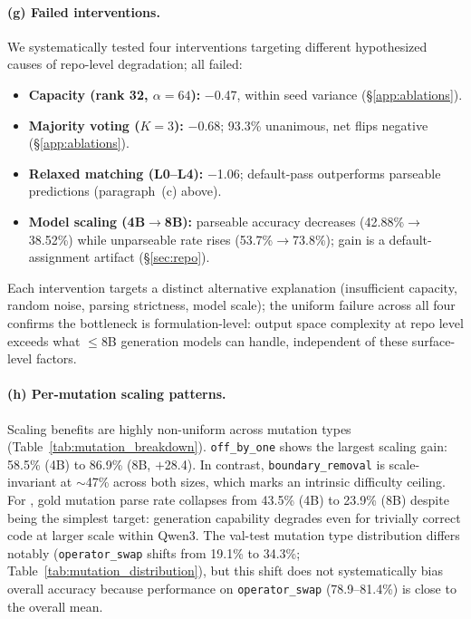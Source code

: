 \paragraph{(g) Failed interventions.}
We systematically tested four interventions targeting different hypothesized causes of \cwm{} repo-level degradation; all failed:

\begin{itemize}[leftmargin=*,itemsep=1pt,topsep=2pt]
\item \textbf{Capacity (rank 32, $\alpha{=}64$):} $-$0.47\pp{}, within seed variance (\S\ref{app:ablations}).
\item \textbf{Majority voting ($K{=}3$):} $-$0.68\pp{}; 93.3\% unanimous, net flips negative (\S\ref{app:ablations}).
\item \textbf{Relaxed matching (L0--L4):} $-$1.06\pp{}; default-pass outperforms parseable predictions (paragraph~(c) above).
\item \textbf{Model scaling (4B$\to$8B):} parseable accuracy decreases (42.88\%$\to$38.52\%) while unparseable rate rises (53.7\%$\to$73.8\%); gain is a default-assignment artifact (\S\ref{sec:repo}).
\end{itemize}

\noindent Each intervention targets a distinct alternative explanation (insufficient capacity, random noise, parsing strictness, model scale); the uniform failure across all four confirms the bottleneck is formulation-level: output space complexity at repo level exceeds what ${\leq}$8B generation models can handle, independent of these surface-level factors.

\paragraph{(h) Per-mutation scaling patterns.}
Scaling benefits are highly non-uniform across mutation types (Table~\ref{tab:mutation_breakdown}). \texttt{off\_by\_one} shows the largest \cls{} scaling gain: 58.5\% (4B) to 86.9\% (8B, $+$28.4\pp{}). In contrast, \texttt{boundary\_removal} is scale-invariant at ${\sim}$47\% across both sizes, which marks an intrinsic difficulty ceiling. For \cwm{}, gold mutation parse rate collapses from 43.5\% (4B) to 23.9\% (8B) despite being the simplest target: generation capability degrades even for trivially correct code at larger scale within Qwen3. The val-test mutation type distribution differs notably (\texttt{operator\_swap} shifts from 19.1\% to 34.3\%; Table~\ref{tab:mutation_distribution}), but this shift does not systematically bias overall accuracy because \cls{} performance on \texttt{operator\_swap} (78.9--81.4\%) is close to the overall mean.

